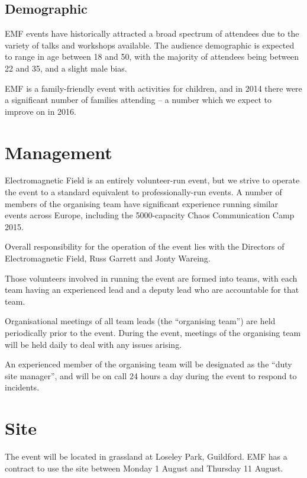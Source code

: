 \subsection{Demographic}

EMF events have historically attracted a broad spectrum of attendees due to the variety of talks
and workshops available. The audience demographic is expected to range in age between
18 and 50, with the majority of attendees being between 22 and 35, and a slight male bias.

EMF is a family-friendly event with activities for children, and in 2014 there were a significant
number of families attending -- a number which we expect to improve on in 2016.

\section{Management}

Electromagnetic Field is an entirely volunteer-run event, but we strive to operate the event to
a standard equivalent to professionally-run events. A number of members of the organising team have
significant experience running similar events across Europe, including the 5000-capacity
Chaos Communication Camp 2015.

Overall responsibility for the operation of the event lies with the Directors of Electromagnetic Field,
Russ Garrett and Jonty Wareing.

Those volunteers involved in running the event are formed into teams, with each team having an
experienced lead and a deputy lead who are accountable for that team.

Organisational meetings of all team leads (the ``organising team'') are held periodically prior to the event.
During the event, meetings of the organising team will be held daily to deal with any issues arising.

An experienced member of the organising team will be designated as the ``duty site manager'', and will be
on call 24 hours a day during the event to respond to incidents.

\section{Site}

The event will be located in grassland at Loseley Park, Guildford. EMF has a contract to use the site between
Monday 1 August and Thursday 11 August.

